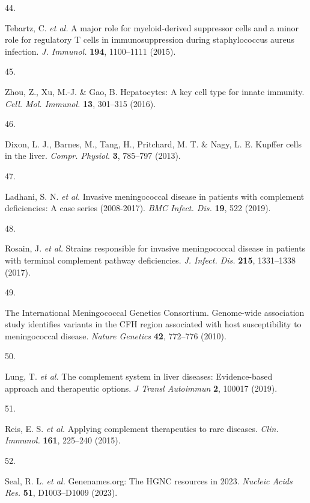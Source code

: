\documentclass[
]{article}
\newlength{\cslhangindent}
\newlength{\csllabelwidth}
\newenvironment{CSLReferences}[2] %
 {\begin{list}{}{%
  \setlength{\itemindent}{0pt}
  \setlength{\leftmargin}{0pt}
  \setlength{\parsep}{0pt}
  \ifodd #1
   \setlength{\leftmargin}{\cslhangindent}
   \setlength{\itemindent}{-1\cslhangindent}
  \fi
  \setlength{\itemsep}{#2\baselineskip}}}
 {\end{list}}
\newcommand{\CSLLeftMargin}[1]{\parbox[t]{\csllabelwidth}{\strut#1\strut}}
\newcommand{\CSLRightInline}[1]{\parbox[t]{\linewidth - \csllabelwidth}{\strut#1\strut}}
\begin{document}
\begin{CSLReferences}{0}{0}
\CSLLeftMargin{44. }%
\CSLRightInline{Tebartz, C. \emph{et al.} A major role for
myeloid-derived suppressor cells and a minor role for regulatory {T}
cells in immunosuppression during staphylococcus aureus infection.
\emph{J. Immunol.} \textbf{194}, 1100--1111 (2015).}

\CSLLeftMargin{45. }%
\CSLRightInline{Zhou, Z., Xu, M.-J. \& Gao, B. Hepatocytes: A key cell
type for innate immunity. \emph{Cell. Mol. Immunol.} \textbf{13},
301--315 (2016).}

\CSLLeftMargin{46. }%
\CSLRightInline{Dixon, L. J., Barnes, M., Tang, H., Pritchard, M. T. \&
Nagy, L. E. Kupffer cells in the liver. \emph{Compr. Physiol.}
\textbf{3}, 785--797 (2013).}

\CSLLeftMargin{47. }%
\CSLRightInline{Ladhani, S. N. \emph{et al.} Invasive meningococcal
disease in patients with complement deficiencies: A case series
(2008-2017). \emph{BMC Infect. Dis.} \textbf{19}, 522 (2019).}

\CSLLeftMargin{48. }%
\CSLRightInline{Rosain, J. \emph{et al.} Strains responsible for
invasive meningococcal disease in patients with terminal complement
pathway deficiencies. \emph{J. Infect. Dis.} \textbf{215}, 1331--1338
(2017).}

\CSLLeftMargin{49. }%
\CSLRightInline{The International Meningococcal Genetics Consortium.
Genome-wide association study identifies variants in the {CFH} region
associated with host susceptibility to meningococcal disease.
\emph{Nature Genetics} \textbf{42}, 772--776 (2010).}

\CSLLeftMargin{50. }%
\CSLRightInline{Lung, T. \emph{et al.} The complement system in liver
diseases: Evidence-based approach and therapeutic options. \emph{J
Transl Autoimmun} \textbf{2}, 100017 (2019).}

\CSLLeftMargin{51. }%
\CSLRightInline{Reis, E. S. \emph{et al.} Applying complement
therapeutics to rare diseases. \emph{Clin. Immunol.} \textbf{161},
225--240 (2015).}

\CSLLeftMargin{52. }%
\CSLRightInline{Seal, R. L. \emph{et al.} Genenames.org: The {HGNC}
resources in 2023. \emph{Nucleic Acids Res.} \textbf{51}, D1003--D1009
(2023).}


\end{CSLReferences}
\end{document}
